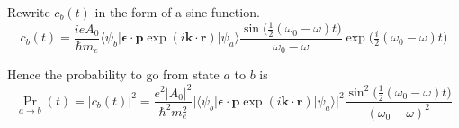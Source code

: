 Rewrite $c_b(t)$ in the form of a sine function.
\begin{equation*}
c_b(t)=\frac{ieA_0}{\hbar m_e}
\langle\psi_b|\boldsymbol{\epsilon}\cdot\mathbf p\exp(i\mathbf k\cdot\mathbf r)|\psi_a\rangle
\frac{\sin\bigl(\tfrac{1}{2}(\omega_0-\omega)t\bigr)}{\omega_0-\omega}
\exp\bigl(\tfrac{i}{2}(\omega_0-\omega)t\bigr)
\tag{2}
\end{equation*}

Hence the probability to go from state $a$ to $b$ is
\begin{equation*}
\Pr_{a\rightarrow b}(t)=|c_b(t)|^2=\frac{e^2|A_0|^2}{\hbar^2m_e^2}
\bigl|\langle\psi_b|\boldsymbol{\epsilon}\cdot\mathbf p\exp(i\mathbf k\cdot\mathbf r)|\psi_a\rangle\bigr|^2
\frac{\sin^2\bigl(\tfrac{1}{2}(\omega_0-\omega)t\bigr)}{(\omega_0-\omega)^2}
\end{equation*}


